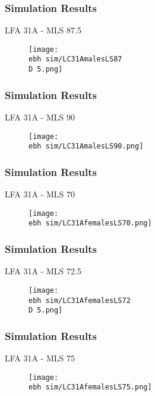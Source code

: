 \documentclass{beamer}
\newcommand{\ebh}{\string~/bio.data/bio.lobster/figures/LFA2733Framework2018/} %
\newcommand{\D}{.}
\begin{document}
\begin{frame}
\frametitle{Simulation Results}
LFA 31A - MLS 87.5
\begin{figure}
        \begin{center}
            \texttt{[image: \\ebh sim/LC31AmalesLS87\\D 5.png]}
        \end{center}
    \end{figure}
\end{frame}


\begin{frame}
\frametitle{Simulation Results}
LFA 31A - MLS 90
\begin{figure}
        \begin{center}
            \texttt{[image: \\ebh sim/LC31AmalesLS90.png]}
        \end{center}
    \end{figure}
\end{frame}




\begin{frame}
\frametitle{Simulation Results}
LFA 31A - MLS 70
\begin{figure}
        \begin{center}
            \texttt{[image: \\ebh sim/LC31AfemalesLS70.png]}
        \end{center}
    \end{figure}
\end{frame}


\begin{frame}
\frametitle{Simulation Results}
LFA 31A - MLS 72.5
\begin{figure}
        \begin{center}
            \texttt{[image: \\ebh sim/LC31AfemalesLS72\\D 5.png]}
        \end{center}
    \end{figure}
\end{frame}


\begin{frame}
\frametitle{Simulation Results}
LFA 31A - MLS 75
\begin{figure}
        \begin{center}
            \texttt{[image: \\ebh sim/LC31AfemalesLS75.png]}
        \end{center}
    \end{figure}
\end{frame}
\end{document}
